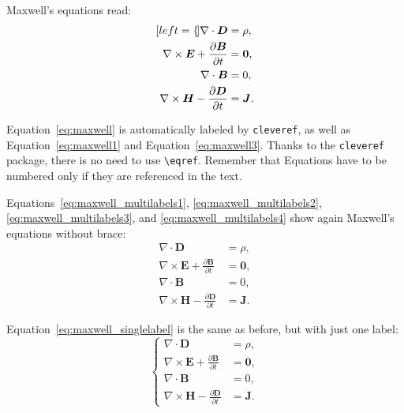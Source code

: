 \documentclass{config/PoliMi3i_thesis}
\begin{document}
Maxwell's equations read:
\begin{subequations}
    \label{eq:maxwell}
    \begin{align}[left=\empheqlbrace]
        \nabla\cdot \bm{D}                                         & = \rho, \label{eq:maxwell1}   \\
        \nabla \times \bm{E} +  \frac{\partial \bm{B}}{\partial t} & = \bm{0}, \label{eq:maxwell2} \\
        \nabla\cdot \bm{B}                                         & = 0, \label{eq:maxwell3}      \\
        \nabla \times \bm{H} - \frac{\partial \bm{D}}{\partial t}  & = \bm{J}. \label{eq:maxwell4}
    \end{align}
\end{subequations}

Equation~\eqref{eq:maxwell} is automatically labeled by \texttt{cleveref},
as well as Equation~\eqref{eq:maxwell1} and Equation~\eqref{eq:maxwell3}.
Thanks to the \verb|cleveref| package, there is no need to use \verb|\eqref|.
Remember that Equations have to be numbered only if they are referenced in the text.

Equations~\eqref{eq:maxwell_multilabels1}, \eqref{eq:maxwell_multilabels2}, \eqref{eq:maxwell_multilabels3}, and \eqref{eq:maxwell_multilabels4} show again Maxwell's equations without brace:
\begin{align}
    \nabla\cdot \bm{D}                                         & = \rho, \label{eq:maxwell_multilabels1}   \\
    \nabla \times \bm{E} +  \frac{\partial \bm{B}}{\partial t} & = \bm{0}, \label{eq:maxwell_multilabels2} \\
    \nabla\cdot \bm{B}                                         & = 0, \label{eq:maxwell_multilabels3}      \\
    \nabla \times \bm{H} - \frac{\partial \bm{D}}{\partial t}  & = \bm{J} \label{eq:maxwell_multilabels4}.
\end{align}

Equation~\eqref{eq:maxwell_singlelabel} is the same as before,
but with just one label:
\begin{equation}
    \label{eq:maxwell_singlelabel}
    \left\{
    \begin{aligned}
        \nabla\cdot \bm{D}                                         & = \rho,   \\
        \nabla \times \bm{E} +  \frac{\partial \bm{B}}{\partial t} & = \bm{0}, \\
        \nabla\cdot \bm{B}                                         & = 0,      \\
        \nabla \times \bm{H} - \frac{\partial \bm{D}}{\partial t}  & = \bm{J}.
    \end{aligned}
    \right.
\end{equation}
\end{document}
